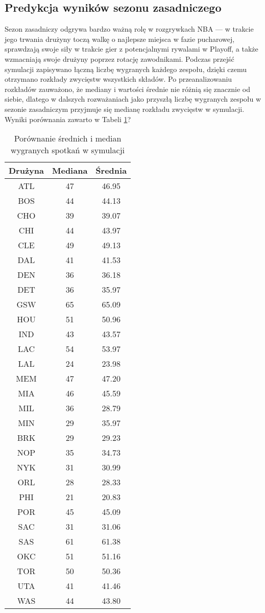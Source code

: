 \documentclass[inzynierska]{pwr_wmat_praca_dyplomowa}
\theoremstyle{plain}
\numberwithin{theorem}{chapter}
\theoremstyle{definition}
\numberwithin{theorem}{chapter}
\begin{document}
\subsection{Predykcja wyników sezonu zasadniczego}
Sezon zasadniczy odgrywa bardzo ważną rolę w rozgrywkach NBA --- w trakcie jego trwania drużyny toczą walkę o najlepsze miejsca w fazie pucharowej, sprawdzają swoje siły w trakcie gier z potencjalnymi rywalami w Playoff, a także wzmacniają swoje drużyny poprzez rotację zawodnikami. Podczas przejść symulacji zapisywano łączną liczbę wygranych każdego zespołu, dzięki czemu otrzymano rozkłady zwycięstw wszystkich składów. Po przeanalizowaniu rozkładów zauważono, że mediany i wartości średnie nie różnią się znacznie od siebie, dlatego w dalszych rozważaniach jako przyszłą liczbę wygranych zespołu w sezonie zasadniczym przyjmuje się medianę rozkładu zwycięstw w symulacji. Wyniki porównania zawarto w Tabeli \ref{srednie_mediany}?
\begin{table}[]
	\centering
	\begin{tabular}{|c|c|c|}
		\hline
		\textbf{Drużyna}      & \textbf{Mediana} & \textbf{Średnia} \\ \hline
		ATL & 47 & 46.95\\ \hline
		BOS & 44 & 44.13\\ \hline
		CHO & 39 & 39.07\\ \hline
		CHI & 44 & 43.97\\ \hline
		CLE & 49 & 49.13\\ \hline
		DAL & 41 & 41.53\\ \hline
		DEN & 36 & 36.18\\ \hline
		DET & 36 & 35.97\\ \hline
		GSW & 65 & 65.09\\ \hline
		HOU & 51 & 50.96\\ \hline
		IND & 43 & 43.57\\ \hline
		LAC & 54 & 53.97\\ \hline
		LAL & 24 & 23.98\\ \hline
		MEM & 47 & 47.20\\ \hline
		MIA & 46 & 45.59\\ \hline
		MIL & 36 & 28.79\\ \hline
		MIN & 29 & 35.97\\ \hline
		BRK & 29 & 29.23\\ \hline
		NOP & 35 & 34.73\\ \hline
		NYK & 31 & 30.99\\ \hline
		ORL & 28 & 28.33\\ \hline
		PHI & 21 & 20.83\\ \hline
		POR & 45 & 45.09\\ \hline
		SAC & 31 & 31.06\\ \hline
		SAS & 61 & 61.38\\ \hline
		OKC & 51 & 51.16\\ \hline
		TOR & 50 & 50.36\\ \hline
		UTA & 41 & 41.46\\ \hline
		WAS & 44 & 43.80\\ \hline
	\end{tabular}
\caption{Porównanie średnich i median wygranych spotkań w symulacji}\label{srednie_mediany}	
\end{table}
\end{document}
